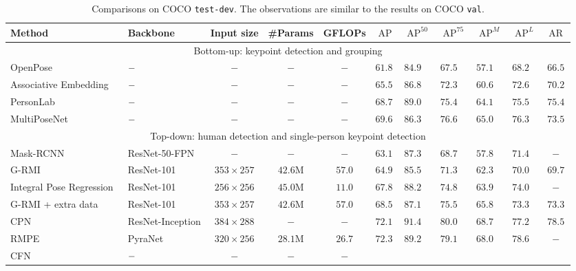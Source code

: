 \documentclass[10pt,journal,compsoc]{IEEEtran}
\begin{document}
	\begin{table}[t]
		\caption{Comparisons on COCO \texttt{test-dev}.   
		{The observations are similar to
		the results on COCO \texttt{val}.
		}
		}
	\centering
			\label{table:coco_test_dev}
			\footnotesize
			\vspace{-0.3cm}
            \begin{tabular}{l|l|c|c|c|lllllc}
				\hline
				Method &Backbone& Input size & \#Params & GFLOPs&
				$\operatorname{AP}$ & $\operatorname{AP}^{50}$ & $\operatorname{AP}^{75}$ & $\operatorname{AP}^{M}$ & $\operatorname{AP}^{L}$ & $\operatorname{AR}$\\
				\hline
				\multicolumn{11}{c}{Bottom-up: keypoint detection and grouping}\\
				\hline
				OpenPose~\cite{CaoSWS17} &$\hfil-$& $-$ &$-$& $-$  
				&$61.8$ & $84.9$&$67.5$&$57.1$&$68.2$&$66.5$\\
				Associative Embedding~\cite{NewellHD17} & $\hfil-$ & $-$ &$-$& $-$
				&$65.5$ & $86.8$&$72.3$&$60.6$&$72.6$&$70.2$\\
				PersonLab~\cite{PapandreouZCGTK18} & $\hfil-$ & $-$ &$-$& $-$
				&$68.7$ & $89.0$&$75.4$&$64.1$&$75.5$&$75.4$\\
				MultiPoseNet~\cite{KocabasKA18} & $\hfil-$ & $-$ &$-$& $-$
				&$69.6$ & $86.3$&$76.6$&$65.0$&$76.3$&$73.5$\\
				\hline 
				\multicolumn{11}{c}{Top-down: human detection and single-person keypoint detection}\\
				\hline
				Mask-RCNN~\cite{HeGDG17} & ResNet-50-FPN& $-$ &$-$& $-$
				& $63.1$ & $87.3$&$68.7$&$57.8$&$71.4$&$-$\\
				G-RMI~\cite{PapandreouZKTTB17} & ResNet-101 & $353\times257$ &$42.6$M& $57.0$
				&$64.9$ & $85.5$&$71.3$&$62.3$&$70.0$&$69.7$\\
				Integral Pose Regression~\cite{SunXWLW18} & ResNet-101 & $256\times256$ &$45.0$M& $11.0$
				&$67.8$ & $88.2$&$74.8$&$63.9$&$74.0$&$-$\\
				G-RMI + extra data~\cite{PapandreouZKTTB17} & ResNet-101 & $353\times257$ &$42.6$M& $57.0$
				&$68.5$ & $87.1$&$75.5$&$65.8$&$73.3$&$73.3$\\
				CPN~\cite{ChenWPZYS17} & ResNet-Inception& $384\times288$ &$-$& $-$
				& $72.1$ & $91.4$&$80.0$&$68.7$&$77.2$&$78.5$\\
				RMPE~\cite{FangXTL17} & PyraNet~\cite{YangLOLW17} & $320\times256$ &$28.1$M& $26.7$
				&$72.3$ & $89.2$&$79.1$&$68.0$&$78.6$&$-$\\
				CFN~\cite{HuangGT17} & $\hfil-$ & $-$ &$-$& $-$

\end{tabular}
\end{table}
\end{document}
